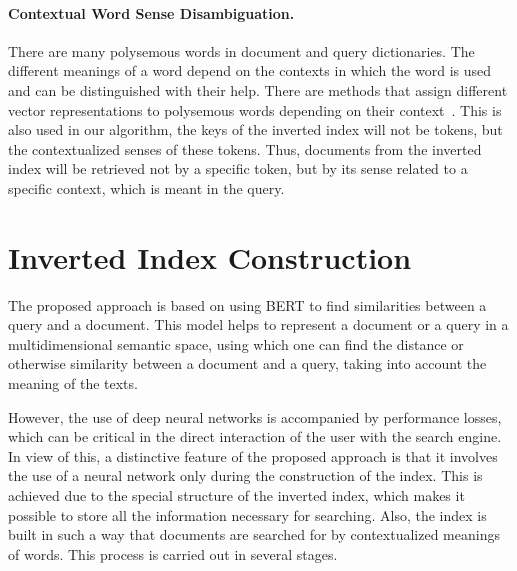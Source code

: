 \documentclass[
    twocolumn,
]{template/ceurart}
\begin{document}
    \paragraph{Contextual Word Sense Disambiguation.}
    There are many polysemous words in document and query dictionaries.
    The different meanings of a word depend on the contexts in which the word is used and
    can be distinguished with their help.
    There are methods that assign different vector representations
    to polysemous words depending on their context~\cite{athiwaratkun2018probabilistic}.
    This is also used in our algorithm, the keys of the inverted index will not be tokens,
    but the contextualized senses of these tokens.
    Thus, documents from the inverted index will be retrieved not by a specific token,
    but by its sense related to a specific context, which is meant in the query.


    \section{Inverted Index Construction}
    The proposed approach is based on using BERT to find similarities between a query and a document.
    This model helps to represent a document or a query in a multidimensional semantic space,
    using which one can find the distance or otherwise similarity between a document and a query,
    taking into account the meaning of the texts.

    However, the use of deep neural networks is accompanied by performance losses,
    which can be critical in the direct interaction of the user with the search engine.
    In view of this, a distinctive feature of the proposed approach is that it involves the use of a neural network
    only during the construction of the index.
    This is achieved due to the special structure of the inverted index,
    which makes it possible to store all the information necessary for searching.
    Also, the index is built in such a way that documents are searched for by contextualized meanings of words.
    This process is carried out in several stages.
\end{document}
